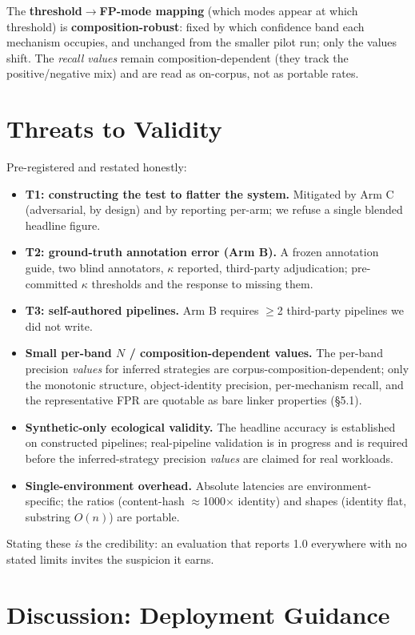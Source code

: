 \documentclass[11pt]{article}
\newcommand{\dto}{\ensuremath{\rightarrow}}     %
\begin{document}
The \textbf{threshold\dto{}FP-mode mapping} (which modes appear at which threshold) is
\textbf{composition-robust}: fixed by which confidence band each mechanism occupies, and unchanged from
the smaller pilot run; only the values shift. The \emph{recall values} remain composition-dependent (they
track the positive/negative mix) and are read as on-corpus, not as portable rates.

\section{Threats to Validity}

Pre-registered and restated honestly:
\begin{itemize}[leftmargin=*]
\item \textbf{T1: constructing the test to flatter the system.} Mitigated by Arm C (adversarial, by
design) and by reporting per-arm; we refuse a single blended headline figure.
\item \textbf{T2: ground-truth annotation error (Arm B).} A frozen annotation guide, two blind
annotators, $\kappa$ reported, third-party adjudication; pre-committed $\kappa$ thresholds and the response
to missing them.
\item \textbf{T3: self-authored pipelines.} Arm B requires $\geq$2 third-party pipelines we did not
write.
\item \textbf{Small per-band $N$ / composition-dependent values.} The per-band precision \emph{values} for
inferred strategies are corpus-composition-dependent; only the monotonic structure, object-identity
precision, per-mechanism recall, and the representative FPR are quotable as bare linker properties (\S5.1).
\item \textbf{Synthetic-only ecological validity.} The headline accuracy is established on constructed
pipelines; real-pipeline validation is in progress and is required before the inferred-strategy precision
\emph{values} are claimed for real workloads.
\item \textbf{Single-environment overhead.} Absolute latencies are environment-specific; the ratios
(content-hash $\approx$1000$\times$ identity) and shapes (identity flat, substring $O(n)$) are portable.
\end{itemize}
Stating these \emph{is} the credibility: an evaluation that reports 1.0 everywhere with no stated limits
invites the suspicion it earns.

\section{Discussion: Deployment Guidance}
\end{document}
